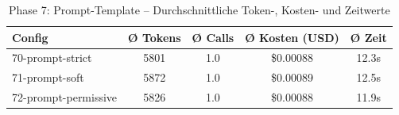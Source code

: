 \begin{table}[H]
\centering
\small
\begin{tabular}{lcccc}
\toprule
Config & Ø Tokens & Ø Calls & Ø Kosten (USD) & Ø Zeit \\
\midrule
70-prompt-strict & 5801 & 1.0 & \$0.00088 & 12.3s \\
71-prompt-soft & 5872 & 1.0 & \$0.00089 & 12.5s \\
72-prompt-permissive & 5826 & 1.0 & \$0.00088 & 11.9s \\
\bottomrule
\end{tabular}
\caption{Phase 7: Prompt-Template -- Durchschnittliche Token-, Kosten- und Zeitwerte}
\label{tab:phase7_cost}
\end{table}